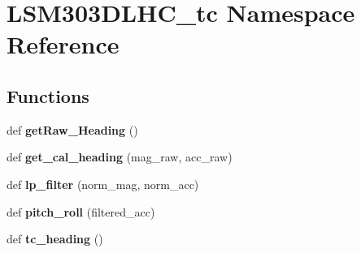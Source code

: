 \hypertarget{namespaceLSM303DLHC__tc}{}\section{L\+S\+M303\+D\+L\+H\+C\+\_\+tc Namespace Reference}
\label{namespaceLSM303DLHC__tc}
\subsection*{Functions}
\begin{DoxyCompactItemize}
\item 
\mbox{\label{namespaceLSM303DLHC__tc_afdbd22919beef6fa404147334274b942}} 
def {\bfseries get\+Raw\+\_\+\+Heading} ()
\item 
\mbox{\label{namespaceLSM303DLHC__tc_a118d156d3065cff7b35cc4c214f621ac}} 
def {\bfseries get\+\_\+cal\+\_\+heading} (mag\+\_\+raw, acc\+\_\+raw)
\item 
\mbox{\label{namespaceLSM303DLHC__tc_a9cc9e64bd5c0afaf6b8fc9f19890e6f1}} 
def {\bfseries lp\+\_\+filter} (norm\+\_\+mag, norm\+\_\+acc)
\item 
\mbox{\label{namespaceLSM303DLHC__tc_ad7d31109d7ecf209ed9dc06d31d68332}} 
def {\bfseries pitch\+\_\+roll} (filtered\+\_\+acc)
\item 
\mbox{\label{namespaceLSM303DLHC__tc_a40ebf836a38368a986974577e143cbb5}} 
def {\bfseries tc\+\_\+heading} ()
\end{DoxyCompactItemize}
